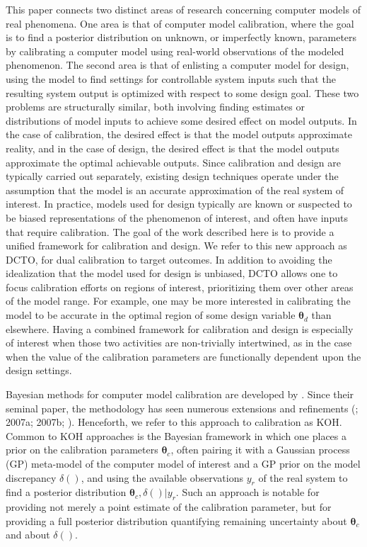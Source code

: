 \documentclass[12pt]{article}
\begin{document}
%
This paper connects two distinct areas of research concerning computer models of real phenomena.
%
One area is that of computer model calibration, where the goal is to find a posterior distribution on unknown, or imperfectly known, parameters by calibrating a computer model using real-world observations of the modeled phenomenon.
%
The second area is that of enlisting a computer model for design, using the model to find settings for controllable system inputs such that the resulting system output is optimized with respect to some design goal.
%
These two problems are structurally similar, both involving finding estimates or distributions of model inputs to achieve some desired effect on model outputs.
%
In the case of calibration, the desired effect is that the model outputs approximate reality, and in the case of design, the desired effect is that the model outputs approximate the optimal achievable outputs.
%
Since calibration and design are typically carried out separately, existing design techniques operate under the assumption that the model is an accurate approximation of the real system of interest.
%
In practice, models used for design typically are known or suspected to be biased representations of the phenomenon of interest, and often have inputs that require calibration.
%
The goal of the work described here is to provide a unified framework for calibration and design.
%
We refer to this new approach as DCTO, for dual calibration to target outcomes.
%
In addition to avoiding the idealization that the model used for design is unbiased, DCTO allows one to focus calibration efforts on regions of interest, prioritizing them over other areas of the model range.
%
For example, one may be more interested in calibrating the model to be accurate in the optimal region of some design variable $\boldsymbol \theta_d$ than elsewhere.
%
Having a combined framework for calibration and design is especially of interest when those two activities are non-trivially intertwined, as in the case when the value of the calibration parameters are functionally dependent upon the design settings.
%

%
Bayesian methods for computer model calibration are developed by \cite{Kennedy2001}.
%
Since their seminal paper, the methodology has seen numerous extensions and refinements (\citealt{Higdon2004,Williams2006}; \citeauthor{Bayarri2007a} 2007a; \citeauthor{Bayarri2007b} 2007b; \citealt{Paulo2012,Brynjarsdottir2014}).
%
Henceforth, we refer to this approach to calibration as KOH.
%
Common to KOH approaches is the Bayesian framework in which one places a prior on the calibration parameters $\boldsymbol \theta_c$, often pairing it with a Gaussian process (GP) meta-model of the computer model of interest and a GP prior on the model discrepancy $\delta()$, and using the available observations $y_r$ of the real system to find a posterior distribution $\boldsymbol\theta_c,\delta()|y_r$.
%
Such an approach is notable for providing not merely a point estimate of the calibration parameter, but for providing a full posterior distribution quantifying remaining uncertainty about $\boldsymbol\theta_c$ and about $\delta()$.
%
\end{document}
